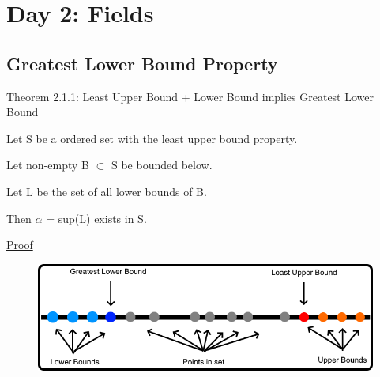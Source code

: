 \newpage
\section[Day 2: Fields and Order]{Day 2: Fields}





\subsection{Greatest Lower Bound Property}

{ \color{red} Theorem 2.1.1:
Least Upper Bound + Lower Bound implies Greatest Lower Bound }

	\begin{adjustbox}{minipage=14cm, right}
		Let S be a ordered set with the least upper bound property.

		Let non-empty B $\subset$ S be bounded below.

		Let L be the set of all lower bounds of B.

		Then $\alpha$ = sup(L) exists in S.
	\end{adjustbox}

{ \color{magenta} \underline{Proof} }


\begin{figure}[h]
	\centering
	\includegraphics[scale=0.45]{Images/2.1.png}
\end{figure}





